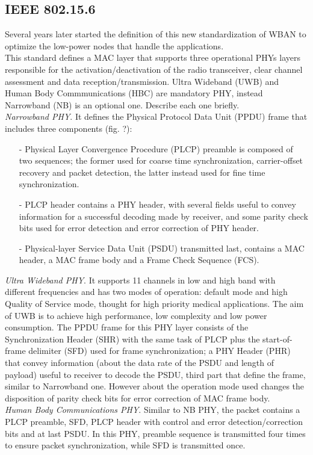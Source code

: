 \documentclass[conference]{IEEEtran}
\begin{document}
\subsection{IEEE 802.15.6}
Several years later started the definition of this new standardization of WBAN to optimize the low-power nodes that handle the applications.
\\This standard defines a MAC layer that supports three operational PHYs layers responsible for the activation/deactivation of the radio  transceiver, clear channel assessment and data reception/transmission. Ultra Wideband (UWB) and Human Body Commmunications (HBC) are mandatory PHY, instead Narrowband (NB) is an optional one. Describe each one briefly.
\\\textit{Narrowband PHY}. It defines the Physical Protocol Data Unit (PPDU) frame that includes three components (fig. ?): 
\begin{itemize}
	\item[-] Physical Layer Convergence Procedure (PLCP) preamble is composed of two sequences; the former used for coarse time synchronization, carrier-offset recovery and packet detection, the latter instead used for fine time synchronization.
	\item[-] PLCP header contains a PHY header, with several fields useful to convey information for a successful decoding made by receiver, and some parity check bits used for error detection and error correction of PHY header.
	\item[-] Physical-layer Service Data Unit (PSDU) transmitted last, contains a MAC header, a MAC frame body and a Frame Check Sequence (FCS).
\end{itemize}
\textit{Ultra Wideband PHY}. It supports 11 channels in low and high band with different frequencies and has two modes of operation: default mode and high Quality of Service mode, thought for high priority medical applications. The aim of UWB is to achieve high performance, low complexity and low power consumption. The PPDU frame for this PHY layer consists of the Synchronization Header (SHR) with the same task of PLCP plus the start-of-frame delimiter (SFD) used for frame synchronization; a PHY Header (PHR) that convey information (about the data rate of the PSDU and length of payload) useful to receiver to decode the PSDU, third part that define the frame, similar to Narrowband one. However about the operation mode used changes the disposition of parity check bits for error correction of MAC frame body.
\\\textit{Human Body Communications PHY}. Similar to NB PHY, the packet contains a PLCP preamble, SFD, PLCP header with control and error detection/correction bits and at last PSDU. In this PHY, preamble sequence is transmitted four times to ensure packet synchronization, while SFD is transmitted once.
\end{document}
